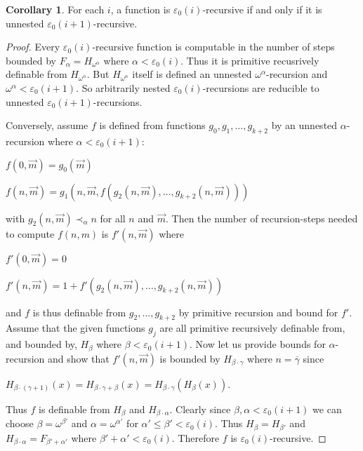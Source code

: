 \documentclass[8pt]{article}
\theoremstyle{definition}
\theoremstyle{definition}
\theoremstyle{definition}
\theoremstyle{definition}
\theoremstyle{definition}
\theoremstyle{definition}
\theoremstyle{definition}
\theoremstyle{definition}
\theoremstyle{definition}
\theoremstyle{definition}
\theoremstyle{definition}
\theoremstyle{definition}
\theoremstyle{definition}
\newtheorem{col}{Corollary}[section]
\theoremstyle{question}
\begin{document}
\begin{col}
For each $i$, a function is $\varepsilon_0(i)$-recursive if and only if it is unnested $\varepsilon_0(i + 1)$-recursive.
\end{col}

\begin{proof}
Every $\varepsilon_0(i)$-recursive function is computable in the number of steps bounded
by $F_{\alpha} = H_{\omega^{\alpha}}$ where $\alpha < \varepsilon_0(i)$. Thus it is primitive recusrively definable
from $H_{\omega^{\alpha}}$. But $H_{\omega^{\alpha}}$ itself is defined an unnested 
$\omega^{\alpha}$-recursion and $\omega^{\alpha} < \varepsilon_0(i + 1)$. So arbitrarily nested 
$\varepsilon_0(i)$-recursions are reducible to unnested $\varepsilon_0(i + 1)$-recursions.

Conversely, assume $f$ is defined from functions $g_0, g_1, \dots, g_{k + 2}$ by an unnested $\alpha$-recursion where
$\alpha < \varepsilon_0(i + 1)$:

\begin{center}
  $f(0, \vec{m}) = g_0(\vec{m})$

  $f(n, \vec{m}) = g_1(n, \vec{m}, f(g_2(n, \vec{m}), \dots, g_{k + 2}(n, \vec{m})))$
\end{center}
with $g_2(n, \vec{m}) \prec_{\alpha} n$ for all $n$ and $\vec{m}$. Then the number of recursion-steps
needed to compute $f(n, m)$ is $f'(n, \vec{m})$ where

\begin{center}
  $f'(0, \vec{m}) = 0$

  $f'(n, \vec{m}) = 1 + f'(g_2(n,\vec{m}), \dots, g_{k + 2}(n, \vec{m}))$
\end{center}
and $f$ is thus definable from $g_2, \dots, g_{k + 2}$ by primitive recursion and bound for $f'$.
Assume that the given functions $g_j$ are all primitive recursively definable from, and bounded by, $H_{\beta}$ where
$\beta < \varepsilon_0(i + 1)$. Now let us provide bounds for $\alpha$-recursion and show that $f'(n, \vec{m})$
is bounded by $H_{\beta \cdot \gamma}$ where $n = \overline{\gamma}$ since
\begin{center}
  $H_{\beta \cdot (\gamma + 1)}(x) = H_{\beta \cdot \gamma + \beta}(x) = H_{\beta \cdot \gamma}(H_{\beta}(x))$.
\end{center}

Thus $f$ is definable from $H_{\beta}$ and $H_{\beta \cdot \alpha}$. Clearly since 
$\beta, \alpha < \varepsilon_0(i + 1)$ we can choose $\beta = \omega^{\beta'}$ and $\alpha = \omega^{\alpha'}$
for $\alpha' \leq \beta' < \varepsilon_0(i)$. Thus $H_{\beta} = H_{\beta'}$ and 
$H_{\beta \cdot \alpha} = F_{\beta' + \alpha'}$ where $\beta' + \alpha' < \varepsilon_0(i)$. 
Therefore $f$ is $\varepsilon_0(i)$-recursive.
\end{proof}
\end{document}
